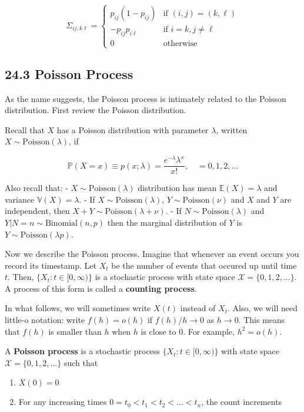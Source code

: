 \[ 
\Sigma_{ij, k\ell} = \begin{cases}
p_{ij}(1 - p_{ij}) &\text{if } (i, j) = (k, \ell) \\
-p_{ij} p_{i\ell} &\text{if } i = k, j \neq \ell \\
0 &\text{otherwise}
\end{cases}
\]

\subsection*{24.3 Poisson Process}\label{poisson-process}

As the name suggests, the Poisson process is intimately related to the
Poisson distribution. First review the Poisson distribution.

Recall that \(X\) has a Poisson distribution with parameter \(\lambda\),
written \(X \sim \text{Poisson}(\lambda)\), if

\[ \mathbb{P}(X = x) \equiv p(x; \lambda) = \frac{e^{-\lambda} \lambda^x}{x!}, \quad = 0, 1, 2, \dots \]

Also recall that: - \(X \sim \text{Poisson}(\lambda)\) distribution has
mean \(\mathbb{E}(X) = \lambda\) and variance
\(\mathbb{V}(X) = \lambda\). - If \(X \sim \text{Poisson}(\lambda)\),
\(Y \sim \text{Poisson}(\nu)\) and \(X\) and \(Y\) are independent, then
\(X + Y \sim \text{Poisson}(\lambda + \nu)\). - If
\(N \sim \text{Poisson}(\lambda)\) and
\(Y | N = n \sim \text{Binomial}(n, p)\) then the marginal distribution
of \(Y\) is \(Y \sim \text{Poisson}(\lambda p)\).

Now we describe the Poisson process. Imagine that whenever an event
occurs you record its timestamp. Let \(X_t\) be the number of events
that occured up until time \(t\). Then,
\(\{ X_t : t \in [0, \infty) \}\) is a stochastic process with state
space \(\mathcal{X} = \{ 0, 1, 2, \dots \}\). A process of this form is
called a \textbf{counting process}.

In what follows, we will sometimes write \(X(t)\) instead of \(X_t\).
Also, we will need little-o notation: write \(f(h) = o(h)\) if
\(f(h) / h \rightarrow 0\) as \(h \rightarrow 0\). This means that
\(f(h)\) is smaller than \(h\) when \(h\) is close to 0. For example,
\(h^{2} = o(h)\).

A \textbf{Poisson process} is a stochastic process
\(\{ X_t : t \in [0, \infty) \}\) with state space
\(\mathcal{X} = \{ 0, 1, 2, \dots \}\) such that

\begin{enumerate}[tightlist,label={\arabic*.}]
\item
  \(X(0) = 0\)
\item
  For any increasing times \(0 = t_{0} < t_{1} < t_{2} < \dots < t_{n}\), the
  count increments
\end{enumerate}

